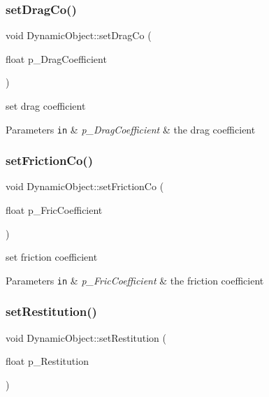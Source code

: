 \subsubsection{\texorpdfstring{set\+Drag\+Co()}{setDragCo()}}
{\footnotesize\ttfamily void Dynamic\+Object\+::set\+Drag\+Co (\begin{DoxyParamCaption}\item[{float}]{p\+\_\+\+Drag\+Coefficient }\end{DoxyParamCaption})}

set drag coefficient 
\begin{DoxyParams}[1]{Parameters}
\mbox{\tt in}  & {\em p\+\_\+\+Drag\+Coefficient} & the drag coefficient \\
\hline
\end{DoxyParams}
\mbox{\label{class_dynamic_object_af6fdf32b8d48afff90e68b2c87d9afe5}} 
\subsubsection{\texorpdfstring{set\+Friction\+Co()}{setFrictionCo()}}
{\footnotesize\ttfamily void Dynamic\+Object\+::set\+Friction\+Co (\begin{DoxyParamCaption}\item[{float}]{p\+\_\+\+Fric\+Coefficient }\end{DoxyParamCaption})}

set friction coefficient 
\begin{DoxyParams}[1]{Parameters}
\mbox{\tt in}  & {\em p\+\_\+\+Fric\+Coefficient} & the friction coefficient \\
\hline
\end{DoxyParams}
\mbox{\label{class_dynamic_object_a0a0a7729f35bd16156a2fbb75d50ea1c}} 
\subsubsection{\texorpdfstring{set\+Restitution()}{setRestitution()}}
{\footnotesize\ttfamily void Dynamic\+Object\+::set\+Restitution (\begin{DoxyParamCaption}\item[{float}]{p\+\_\+\+Restitution }\end{DoxyParamCaption})}

